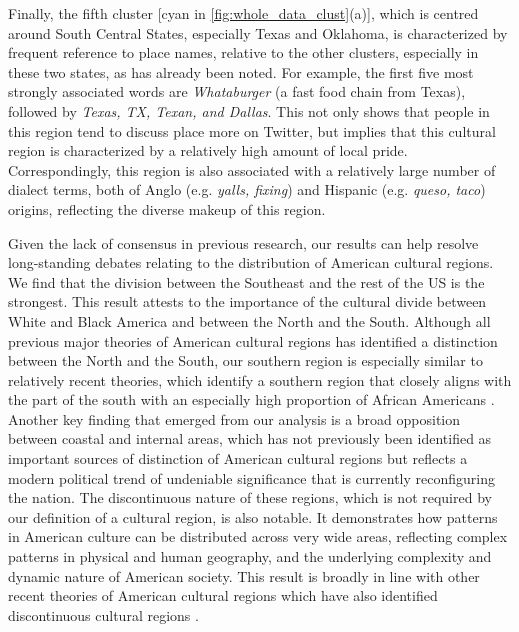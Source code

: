 \documentclass[../thesis.tex]{subfiles}
\begin{document}
Finally, the fifth cluster [cyan in \cref{fig:whole_data_clust}(a)], which is centred
around South Central States, especially Texas and Oklahoma, is characterized by frequent
reference to place names, relative to the other clusters, especially in these two
states, as has already been noted. For example, the first five most strongly associated
words are \textit{Whataburger} (a fast food chain from Texas), followed by
\textit{Texas, TX, Texan, and Dallas}. This not only shows that people in this region
tend to discuss place more on Twitter, but implies that this cultural region is
characterized by a relatively high amount of local pride. Correspondingly, this region
is also associated with a relatively large number of dialect terms, both of Anglo (e.g.
\textit{yalls, fixing}) and Hispanic (e.g. \textit{queso, taco}) origins, reflecting the
diverse makeup of this region.

Given the lack of consensus in previous research, our results can help resolve
long-standing debates relating to the distribution of American cultural regions. We find
that the division between the Southeast and the rest of the US is the strongest. This
result attests to the importance of the cultural divide between White and Black America
and between the North and the South. Although all previous major theories of American
cultural regions has identified a distinction between the North and the South, our
southern region is especially similar to relatively recent theories, which identify a
southern region that closely aligns with the part of the south with an especially high
proportion of African Americans
\cite{LieskeRegionalSubcultures1993,WoodardAmericanNations2012}. Another key finding
that emerged from our analysis is a broad opposition between coastal and internal areas,
which has not previously been identified as important sources of distinction of American
cultural regions
\cite{OdumSouthernRegions1936,ElazarCitiesPrairie1970,ZelinskyCulturalGeography1992,GastilCulturalRegions1975,GarreauNineNations1996,FischerAlbionSeed1989,LieskeRegionalSubcultures1993,WoodardAmericanNations2012}
but reflects a modern political trend of undeniable significance
\cite{GelmanRedState2009} that is currently reconfiguring the nation. The discontinuous
nature of these regions, which is not required by our definition of a cultural region,
is also notable. It demonstrates how patterns in American culture can be distributed
across very wide areas, reflecting complex patterns in physical and human geography, and
the underlying complexity and dynamic nature of American society. This result is broadly
in line with other recent theories of American cultural regions which have also
identified discontinuous cultural regions
\cite{LieskeRegionalSubcultures1993,WoodardAmericanNations2012}.
\end{document}
